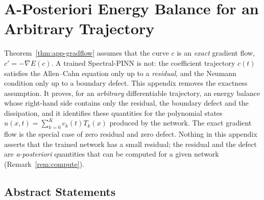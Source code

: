 
\section{A-Posteriori Energy Balance for an Arbitrary Trajectory}\label{app:perturbed}

Theorem~\ref{thm:app-gradflow} assumes that the curve $c$ is an \emph{exact} gradient flow, $c'=-\nabla E(c)$.
A trained Spectral-PINN is not: the coefficient trajectory $c(t)$ satisfies the Allen--Cahn equation only up to a \emph{residual}, and the Neumann condition only up to a boundary defect.
This appendix removes the exactness assumption.
It proves, for an \emph{arbitrary} differentiable trajectory, an energy balance whose right-hand side contains only the residual, the boundary defect and the dissipation, and it identifies these quantities for the polynomial states $u(x,t)=\sum_{k=0}^{K}c_k(t)T_k(x)$ produced by the network.
The exact gradient flow is the special case of zero residual and zero defect.
Nothing in this appendix asserts that the trained network has a small residual; the residual and the defect are \emph{a-posteriori} quantities that can be computed for a given network (Remark~\ref{rem:compute}).

\subsection{Abstract Statements}\label{app:perturbed-abstract}


